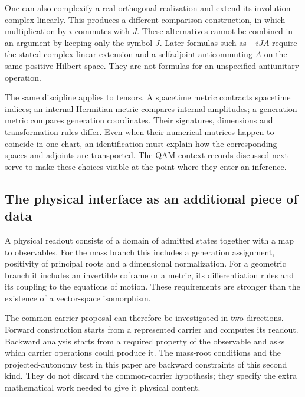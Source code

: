 One can also complexify a real orthogonal realization and extend its
involution complex-linearly. This produces a different comparison
construction, in which multiplication by $i$ commutes with $J$.
These alternatives cannot be combined in an argument by keeping only
the symbol $J$. Later formulas such as $-iJA$ require the stated
complex-linear extension and a selfadjoint anticommuting $A$ on the
same positive Hilbert space. They are not formulas for an unspecified
antiunitary operation.

The same discipline applies to tensors. A spacetime metric contracts
spacetime indices; an internal Hermitian metric compares internal
amplitudes; a generation metric compares generation coordinates.
Their signatures, dimensions and transformation rules differ. Even
when their numerical matrices happen to coincide in one chart, an
identification must explain how the corresponding spaces and adjoints
are transported. The QAM context records discussed next serve to make
these choices visible at the point where they enter an inference.

\subsection{The physical interface as an additional piece of data}
A physical readout consists of a domain of admitted states together
with a map to observables. For the mass branch this includes a
generation assignment, positivity of principal roots and a dimensional
normalization. For a geometric branch it includes an invertible
coframe or a metric, its differentiation rules and its coupling to
the equations of motion. These requirements are stronger than the
existence of a vector-space isomorphism.

The common-carrier proposal can therefore be investigated in two
directions. Forward construction starts from a represented carrier
and computes its readout. Backward analysis starts from a required
property of the observable and asks which carrier operations could
produce it. The mass-root conditions and the projected-autonomy test
in this paper are backward constraints of this second kind. They do
not discard the common-carrier hypothesis; they specify the extra
mathematical work needed to give it physical content.
